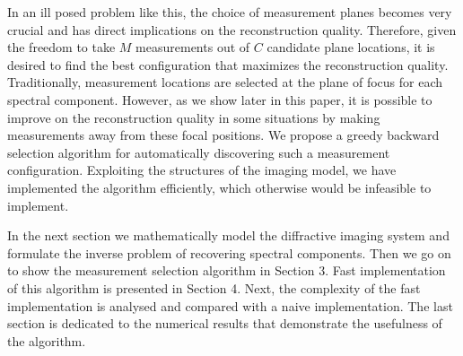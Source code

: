 \documentclass{article}
\begin{document}
In an ill posed problem like this, the choice of measurement planes becomes very
crucial and has direct implications on the reconstruction quality. Therefore,
given the freedom to take $M$ measurements out of $C$ candidate plane locations,
it is desired to find the best configuration that maximizes the reconstruction
quality. Traditionally, measurement locations are selected at the plane of focus
for each spectral component. However, as we show later in this paper, it is
possible to improve on the reconstruction quality in some situations by making
measurements away from these focal positions. We propose a greedy backward
selection algorithm for automatically discovering such a measurement
configuration. Exploiting the structures of the imaging model, we have
implemented the algorithm efficiently, which otherwise would be infeasible to
implement.

In the next section we mathematically model the diffractive imaging system and
formulate the inverse problem of recovering spectral components. Then we go on
to show the measurement selection algorithm in Section 3. Fast implementation of
this algorithm is presented in Section 4. Next, the complexity of the fast
implementation is analysed and compared with a naive implementation. The last
section is dedicated to the numerical results that demonstrate the usefulness of
the algorithm.



\end{document}
